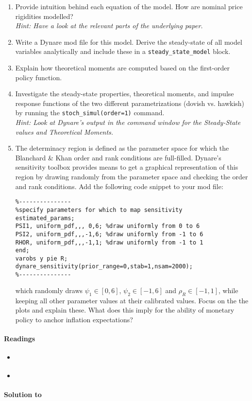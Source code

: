 \begin{enumerate}

\item Provide intuition behind each equation of the model.
How are nominal price rigidities modelled?\\\emph{Hint: Have a look at the relevant parts of the underlying paper.}

\item Write a Dynare mod file for this model. Derive the steady-state of all model variables analytically and include these in a \texttt{steady\_state\_model} block.

\item Explain how theoretical moments are computed based on the first-order policy function.

\item Investigate the steady-state properties, theoretical moments, and impulse response functions of the two different parametrizations (dovish vs. hawkish) 
  by running the \texttt{stoch\_simul(order=1)} command.
\\
\emph{Hint: Look at Dynare's output in the command window for the Steady-State values and Theoretical Moments.}

\item The determinacy region is defined as the parameter space for which the Blanchard \& Khan order and rank conditions are full-filled.
Dynare's sensitivity toolbox provides means to get a graphical representation of this region
  by drawing randomly from the parameter space and checking the order and rank conditions.
Add the following code snippet to your mod file:
\begin{verbatim}
%---------------
%specify parameters for which to map sensitivity
estimated_params;
PSI1, uniform_pdf,,, 0,6; %draw uniformly from 0 to 6
PSI2, uniform_pdf,,,-1,6; %draw uniformly from -1 to 6
RHOR, uniform_pdf,,,-1,1; %draw uniformly from -1 to 1
end;
varobs y pie R;
dynare_sensitivity(prior_range=0,stab=1,nsam=2000);		
%---------------
\end{verbatim}	
  which randomly draws $\psi_1 \in [0,6]$, $\psi_2 \in [-1,6]$ and $\rho_R \in [-1,1]$,
  while keeping all other parameter values at their calibrated values.
Focus on the the plots and explain these.
What does this imply for the ability of monetary policy to anchor inflation expectations?
\end{enumerate}

\paragraph{Readings}
\begin{itemize}
	\item \textcite{An.Schorfheide_2007_BayesianAnalysisDSGE}
	\item \textcite{Ivashchenko.Mutschler_2020_EffectObservablesFunctional}
\end{itemize}

\begin{solution}\textbf{Solution to }
\ifDisplaySolutions%

\fi
\newpage
\end{solution}